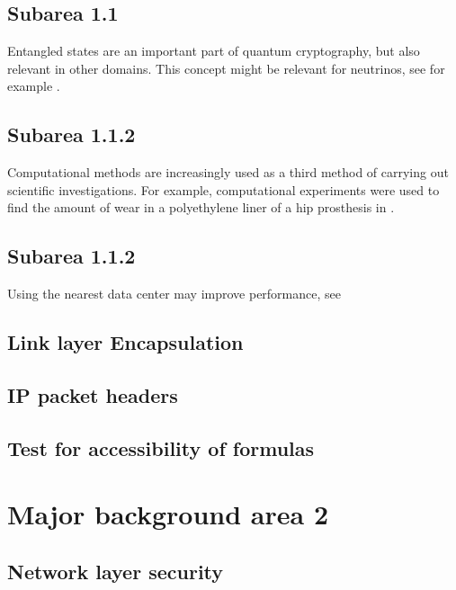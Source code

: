 \subsection{Subarea 1.1}

Entangled states are an important part of quantum cryptography, but also relevant in other domains. This concept might be relevant for neutrinos, see for example \cite{kim_small-mass_2016}.

\subsection{Subarea 1.1.2}

Computational methods are increasingly used as a third method of carrying out
scientific investigations. For example, computational experiments were used to
find the amount of wear in a polyethylene liner of a hip prosthesis in \cite{maguire_jr_new_2014}.

\subsection{Subarea 1.1.2}

Using the nearest data center may improve performance, see \cite{bogdanov_nearest_2015}


\subsection{Link layer Encapsulation}

\label{sec:llencap}

\subsection{IP packet headers}

\label{sec:ipheaders}

\subsection{Test for accessibility of formulas}

\section{Major background area 2}

\subsection{Network layer security}

